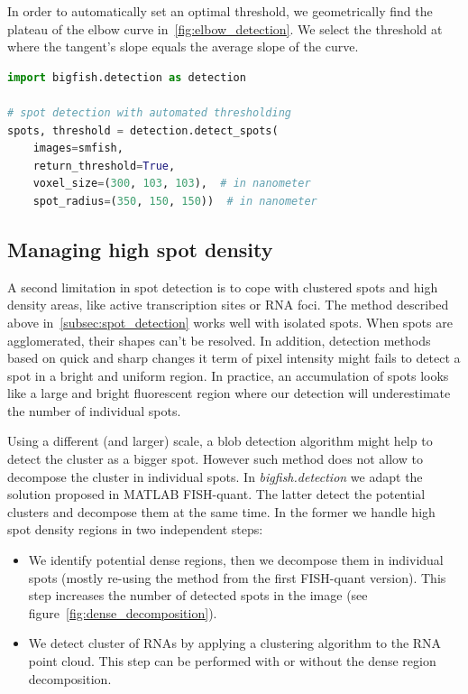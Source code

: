In order to automatically set an optimal threshold, we geometrically find the plateau of the elbow curve in~\ref{fig:elbow_detection}.
We select the threshold at where the tangent's slope equals the average slope of the curve.\\

\begin{minipage}{0.9\textwidth}
\begin{lstlisting}[language=Python]
import bigfish.detection as detection

# spot detection with automated thresholding
spots, threshold = detection.detect_spots(
    images=smfish,
    return_threshold=True,
    voxel_size=(300, 103, 103),  # in nanometer
    spot_radius=(350, 150, 150))  # in nanometer
\end{lstlisting}
\end{minipage}

\subsection{Managing high spot density} \label{subsec:dense_decomposition}

A second limitation in spot detection is to cope with clustered spots and high density areas, like active transcription sites or \ac{RNA} foci.
The method described above in~\ref{subsec:spot_detection} works well with isolated spots.
When spots are agglomerated, their shapes can't be resolved.
In addition, detection methods based on quick and sharp changes it term of pixel intensity might fails to detect a spot in a bright and uniform region.
In practice, an accumulation of spots looks like a large and bright fluorescent region where our detection will underestimate the number of individual spots.

Using a different (and larger) scale, a blob detection algorithm\cite{walt_scikit-image_2014} might help to detect the cluster as a bigger spot.
However such method does not allow to decompose the cluster in individual spots.
In \emph{bigfish.detection} we adapt the solution proposed in MATLAB FISH-quant\cite{mueller_fish-quant_2013}.
The latter detect the potential clusters and decompose them at the same time.
In the former we handle high spot density regions in two independent steps:

\begin{itemize}
	\item We identify potential dense regions, then we decompose them in individual spots (mostly re-using the method from the first FISH-quant version).
	This step increases the number of detected spots in the image (see figure~\ref{fig:dense_decomposition}).
	\item We detect cluster of \ac{RNA}s by applying a clustering algorithm to the \ac{RNA} point cloud.
	This step can be performed with or without the dense region decomposition.
\end{itemize}

